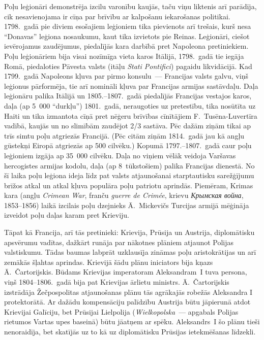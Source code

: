 \documentclass[twoside,a5paper,12pt,fleqn,openany]{extbook}
\newcommand{\pltxti}[1]{\textit{\textpolish{#1}}}
\newcommand{\rutxti}[1]{\textit{\textrussian{#1}}}
\newcommand{\frtxti}[1]{\textit{\textfrench{#1}}}
\newcommand{\entxti}[1]{\textit{\textenglish{#1}}}
\newcommand{\latxti}[1]{\textit{\textlatin{#1}}}
\begin{document}
Poļu leģionāri demonstrēja izcilu varonību kaujās, taču viņu liktenis arī parādīja, cik nesavienojama ir cīņa par brīvību ar kalpošanu iekarošanas politikai. 1798.~gadā pie diviem esošajiem leģioniem tika pievienots arī trešais, kurš nesa ``Donavas'' leģiona nosaukumu, kaut tika izvietots pie Reinas. Leģionāri, ciešot ievērojamus zaudējumus, piedalījās kara darbībā pret Napoleona pretiniekiem. Poļu leģionāriem bija visai nozīmīga vieta karos Itālijā, 1798.~gadā tie iegāja Romā, piedaloties Pāvesta valsts (itāļu \latxti{Stati Pontifici}) pagaidu likvidācijā. Kad 1799.~gadā Napoleons kļuva par pirmo konsulu~--- Francijas valsts galvu, viņš leģionus pārformēja, tie arī nomināli kļuva par Francijas armijas sastāvdaļu. Daļa leģionāru palika Itālijā un 1805.--1807.~gadā piedalījās Francijas vestajos karos, daļa (ap 5~000 ``durkļu'') 1801.~gadā, neraugoties uz pretestību, tika nosūtīta uz Haiti un tika izmantota cīņā pret nēģeru brīvības cīnītājiem F.~Tusēna-Luvertīra vadībā, kaujās un no slimībām zaudējot 2/3 sastāva. Pēc dažām ziņām tikai ap trīs simtu poļu atgriezās Francijā. (Pēc citām ziņām 1814.~gadā jau kā angļu gūstekņi Eiropā atgriezās ap 500 cilvēku.) Kopumā 1797.--1807.~gadā caur poļu leģioniem izgāja ap 35~000 cilvēku. Daļa no viņiem vēlāk veidoja Varšavas hercogistes armijas kodolu, daļa (ap 8~tūkstošiem) palika Francijas dienestā. No šī laika poļu leģiona ideja līdz pat valsts atjaunošanai starptautisku sarežģījumu brīžos atkal un atkal kļuva populāra poļu patriotu aprindās. Piemēram, Krimas kara (angļu \entxti{Crimean War}, franču \frtxti{guerre de Crimée}, krievu \rutxti{Крымская война}, 1853--1856) laikā izcilais poļu dzejnieks Ā.~Mickevičs Turcijas armijā mēģināja izveidot poļu daļas karam pret Krieviju.

Tāpat kā Francija, arī tās pretinieki: Krievija, Prūsija un Austrija, diplomātisku apsvērumu vadītas, dažkārt runāja par nākotnes plāniem atjaunot Polijas valstiskumu. Tādas baumas labprāt uzklausīja zināmas poļu aristokrātijas un arī zemākās šļahtas aprindas. Krievijā šādu plānu iniciators bija kņazs Ā.~Čartorijskis. Būdams Krievijas imperatoram Aleksandram~I tuva persona, viņš 1804--1806.~gadā bija pat Krievijas ārlietu ministrs. Ā.~Čartorijskis izstrādāja Žečpospolitas atjaunošanas plānu tās agrākajās robežās Aleksandra I protektorātā. Ar dažādu kompensāciju palīdzību Austrija būtu jāpierunā atdot Krievijai Galīciju, bet Prūsijai Lielpolija (\pltxti{Wielkopolska}~--- apgabals Polijas rietumos Vartas upes baseinā) būtu jāatņem ar spēku. Aleksandrs~I šo plānu tieši nenoraidīja, bet skatījās uz to kā uz diplomātisku Prūsijas ietekmēšanas līdzekli.
\end{document}
